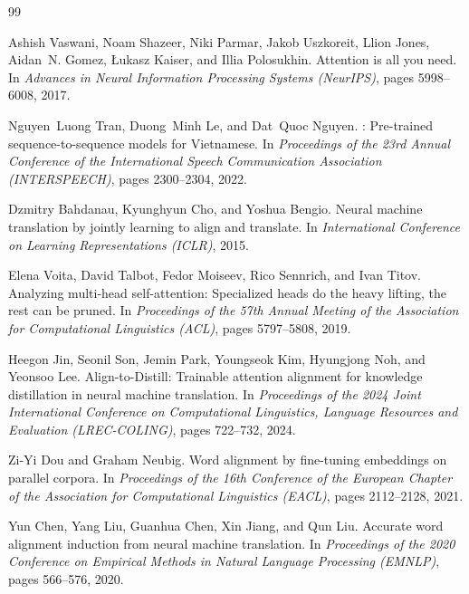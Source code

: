 \documentclass[11pt,a4paper]{article}
\begin{document}
\begin{thebibliography}{99}

Ashish Vaswani, Noam Shazeer, Niki Parmar, Jakob Uszkoreit, Llion Jones, Aidan~N. Gomez, {\L}ukasz Kaiser, and Illia Polosukhin.
\newblock Attention is all you need.
\newblock In \emph{Advances in Neural Information Processing Systems (NeurIPS)}, pages 5998--6008, 2017.

Nguyen~Luong Tran, Duong~Minh Le, and Dat~Quoc Nguyen.
: Pre-trained sequence-to-sequence models for {V}ietnamese.
\newblock In \emph{Proceedings of the 23rd Annual Conference of the International Speech Communication Association (INTERSPEECH)}, pages 2300--2304, 2022.

Dzmitry Bahdanau, Kyunghyun Cho, and Yoshua Bengio.
\newblock Neural machine translation by jointly learning to align and translate.
\newblock In \emph{International Conference on Learning Representations (ICLR)}, 2015.

Elena Voita, David Talbot, Fedor Moiseev, Rico Sennrich, and Ivan Titov.
\newblock Analyzing multi-head self-attention: Specialized heads do the heavy lifting, the rest can be pruned.
\newblock In \emph{Proceedings of the 57th Annual Meeting of the Association for Computational Linguistics (ACL)}, pages 5797--5808, 2019.

Heegon Jin, Seonil Son, Jemin Park, Youngseok Kim, Hyungjong Noh, and Yeonsoo Lee.
\newblock Align-to-Distill: Trainable attention alignment for knowledge distillation in neural machine translation.
\newblock In \emph{Proceedings of the 2024 Joint International Conference on Computational Linguistics, Language Resources and Evaluation (LREC-COLING)}, pages 722--732, 2024.

Zi-Yi Dou and Graham Neubig.
\newblock Word alignment by fine-tuning embeddings on parallel corpora.
\newblock In \emph{Proceedings of the 16th Conference of the European Chapter of the Association for Computational Linguistics (EACL)}, pages 2112--2128, 2021.

Yun Chen, Yang Liu, Guanhua Chen, Xin Jiang, and Qun Liu.
\newblock Accurate word alignment induction from neural machine translation.
\newblock In \emph{Proceedings of the 2020 Conference on Empirical Methods in Natural Language Processing (EMNLP)}, pages 566--576, 2020.


\end{thebibliography}
\end{document}
